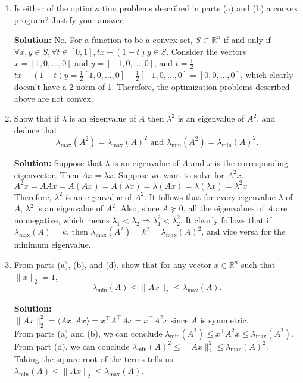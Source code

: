 \documentclass{article}
\newcommand{\solution}{\textbf{Solution: }}
\newcommand{\R}{\mathbb{R}}
\begin{document}
\begin{enumerate}[label=(\alph*)]
    \item Is either of the optimization problems described in parts (a) and (b) a convex program? Justify your answer. 
    \begin{mdframed}
    \solution No. For a function to be a convex set, $S\subset \R^n$ if and only if\\ $\forall x, y \in S, \forall t \in [0, 1], tx+(1-t)y \in S$. Consider the vectors $x=[1, 0, \dots, 0]$ and $y=[-1, 0, \dots, 0]$, and $t=\frac{1}{2}$.\\
    $tx+(1-t)y=\frac{1}{2}[1,0,\dots,0]+\frac{1}{2}[-1,0,\dots,0]=[0,0,\dots,0]$, which clearly doesn't have a 2-norm of 1. Therefore, the optimization problems described above are not convex.
    \end{mdframed}
    
\newpage    
    
    \item Show that if $\lambda$ is an eigenvalue of $A$ then $\lambda^2$ is an eigenvalue of $A^2$, and deduce that $$\lambda_{\max}(A^2) = \lambda_{\max}(A)^2 \text{ and } \lambda_{\min}(A^2) = \lambda_{\min}(A)^2.$$
    \begin{mdframed}
    \solution Suppose that $\lambda$ is an eigenvalue of $A$ and $x$ is the corresponding eigenvector. Then $Ax=\lambda x$. Suppose we want to solve for $A^2x$.\\
    $A^2x=AAx=A(Ax)=A(\lambda x)=\lambda (Ax) = \lambda (\lambda x) = \lambda^2x$\\
    Therefore, $\lambda^2$ is an eigenvalue of $A^2$. It follows that for every eigenvalue $\lambda$ of $A$, $\lambda^2$ is an eigenvalue of $A^2$. Also, since $A \succeq 0$, all the eigenvalues of $A$ are nonnegative, which means $\lambda_1<\lambda_2 \Rightarrow \lambda_1^2 < \lambda_2^2$. It clearly follows that if $\lambda_{\max}(A)=k$, then $\lambda_{\max}(A^2)=k^2=\lambda_{\max}(A)^2$, and vice versa for the minimum eigenvalue.
    \end{mdframed}
    
    \item From parts (a), (b), and (d), show that for any vector $x \in \R^n$ such that $\lVert x \rVert_2 = 1$, $$\lambda_{\min}(A) \leq \lVert Ax \rVert_2 \leq \lambda_{\max}(A).$$
    \begin{mdframed}
    \solution\\
    $\lVert Ax \rVert_2^2 = \langle Ax, Ax \rangle=x^{\top}A^{\top}Ax=x^{\top}A^2x$ since $A$ is symmetric.\\
    From parts (a) and (b), we can conclude $\lambda_{\min}(A^2) \leq x^{\top}A^2x \leq \lambda_{\max}(A^2)$.\\
    From part (d), we can conclude $\lambda_{\min}(A)^2 \leq \lVert Ax \rVert_2^2 \leq \lambda_{\max}(A)^2$.\\
    Taking the square root of the terms tells us $\lambda_{\min}(A) \leq \lVert Ax \rVert_2 \leq \lambda_{\max}(A)$.
    \end{mdframed}
    

\end{enumerate}
\end{document}
